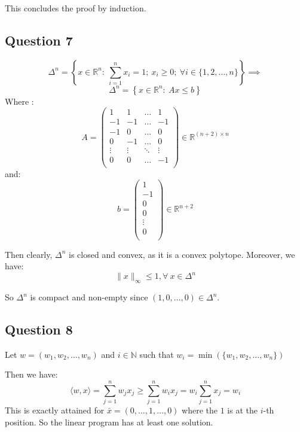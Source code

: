 \documentclass[12p]{article}
\begin{document}
This concludes the proof by induction. 

\subsection*{Question 7}\hfil\par  

\[
  \Delta^n=\left\{x\in\mathbb{R}^n:\ \sum_{i=1}^{n}x_i=1;\ x_i\geq 0;\ \forall i\in\{1,2,\dots,n\}\right\}  \implies 
\]
\[
  \Delta^n=\left\{x\in\mathbb{R}^n:\ Ax\leq b\right\}  
\]
Where :
\[
  A=\begin{pmatrix}
    1 & 1 & \dots & 1\\
    -1& -1 & \dots & -1\\
    -1 & 0 & \dots & 0\\
    0 & -1 & \dots & 0\\
    \vdots & \vdots & \ddots & \vdots\\
    0 & 0 & \dots & -1\\
    \end{pmatrix}\in\mathbb{R}^{(n+2)\times n}
\]
and:
\[
  b=\begin{pmatrix}
    1\\
    -1\\
    0\\
    0\\
    \vdots\\
    0\\
    \end{pmatrix}\in\mathbb{R}^{n+2}   
\]

Then clearly, \(\Delta^n\) is closed and convex, as it is a convex polytope. Moreover, we have:
\[
      \|x\|_\infty\leq 1, \forall \ x\in \Delta^n
\]

So \(\Delta^n\) is compact and non-empty since \((1,0,\dots,0)\in\Delta^n\). 
\subsection*{Question 8} \hfil\par

Let \(w=(w_1,w_2, \dots, w_n)\) and \(i\in \mathbb{N}\) such that \(w_i=\min(\{w_1,w_2,\dots, w_n\})\)
    
    Then we have:
    \[
      \langle w, x\rangle=\sum_{j=1}^{n}w_jx_j\geq \sum_{j=1}^{n}w_ix_j=w_i\sum_{j=1}^{n}x_j=w_i
    \]  
This is exactly attained for \(\bar x=(0,\dots ,1,\dots, 0)\) where the \(1\) is at the \(i\)-th position. So the linear program has at least one solution.
\end{document}
